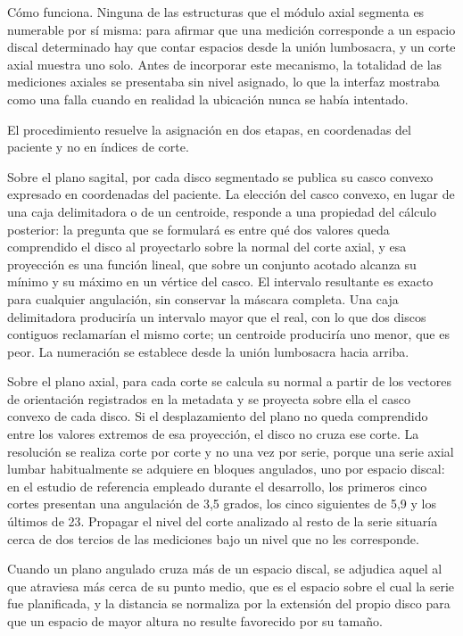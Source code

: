 Cómo funciona. Ninguna de las estructuras que el módulo axial segmenta es numerable por sí misma: para afirmar que una medición corresponde a un espacio discal determinado hay que contar espacios desde la unión lumbosacra, y un corte axial muestra uno solo. Antes de incorporar este mecanismo, la totalidad de las mediciones axiales se presentaba sin nivel asignado, lo que la interfaz mostraba como una falla cuando en realidad la ubicación nunca se había intentado.

El procedimiento resuelve la asignación en dos etapas, en coordenadas del paciente y no en índices de corte.

Sobre el plano sagital, por cada disco segmentado se publica su casco convexo expresado en coordenadas del paciente. La elección del casco convexo, en lugar de una caja delimitadora o de un centroide, responde a una propiedad del cálculo posterior: la pregunta que se formulará es entre qué dos valores queda comprendido el disco al proyectarlo sobre la normal del corte axial, y esa proyección es una función lineal, que sobre un conjunto acotado alcanza su mínimo y su máximo en un vértice del casco. El intervalo resultante es exacto para cualquier angulación, sin conservar la máscara completa. Una caja delimitadora produciría un intervalo mayor que el real, con lo que dos discos contiguos reclamarían el mismo corte; un centroide produciría uno menor, que es peor. La numeración se establece desde la unión lumbosacra hacia arriba.

Sobre el plano axial, para cada corte se calcula su normal a partir de los vectores de orientación registrados en la metadata y se proyecta sobre ella el casco convexo de cada disco. Si el desplazamiento del plano no queda comprendido entre los valores extremos de esa proyección, el disco no cruza ese corte. La resolución se realiza corte por corte y no una vez por serie, porque una serie axial lumbar habitualmente se adquiere en bloques angulados, uno por espacio discal: en el estudio de referencia empleado durante el desarrollo, los primeros cinco cortes presentan una angulación de 3,5 grados, los cinco siguientes de 5,9 y los últimos de 23. Propagar el nivel del corte analizado al resto de la serie situaría cerca de dos tercios de las mediciones bajo un nivel que no les corresponde.

Cuando un plano angulado cruza más de un espacio discal, se adjudica aquel al que atraviesa más cerca de su punto medio, que es el espacio sobre el cual la serie fue planificada, y la distancia se normaliza por la extensión del propio disco para que un espacio de mayor altura no resulte favorecido por su tamaño.

